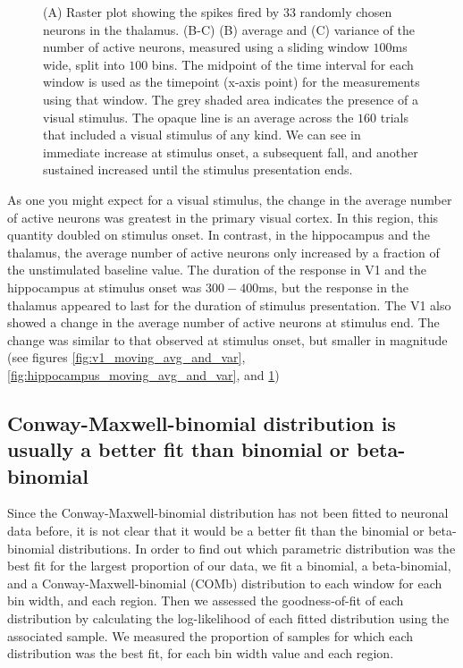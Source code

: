 \begin{figure}[p]
      \caption{(A) Raster plot showing the spikes fired by $33$ randomly chosen neurons in the thalamus. (B-C) (B) average and (C) variance of the number of active neurons, measured using a sliding window $100$ms wide, split into $100$ bins. The midpoint of the time interval for each window is used as the timepoint (x-axis point) for the measurements using that window. The grey shaded area indicates the presence of a visual stimulus. The opaque line is an average across the $160$ trials that included a visual stimulus of any kind. We can see in immediate increase at stimulus onset, a subsequent fall, and another sustained increased until the stimulus presentation ends.}
      \label{fig:thalamus_moving_avg_and_var}
    \end{figure}

    As one you might expect for a visual stimulus, the change in the average number of active neurons was greatest in the primary visual cortex. In this region, this quantity doubled on stimulus onset. In contrast, in the hippocampus and the thalamus, the average number of active neurons only increased by a fraction of the unstimulated baseline value. The duration of the response in V1 and the hippocampus at stimulus onset was $300-400$ms, but the response in the thalamus appeared to last for the duration of stimulus presentation. The V1 also showed a change in the average number of active neurons at stimulus end. The change was similar to that observed at stimulus onset, but smaller in magnitude (see figures \ref{fig:v1_moving_avg_and_var}, \ref{fig:hippocampus_moving_avg_and_var}, and \ref{fig:thalamus_moving_avg_and_var})

  \subsection{Conway-Maxwell-binomial distribution is usually a better fit than binomial or beta-binomial}
  Since the Conway-Maxwell-binomial distribution has not been fitted to neuronal data before, it is not clear that it would be a better fit than the binomial or beta-binomial distributions. In order to find out which parametric distribution was the best fit for the largest proportion of our data, we fit a binomial, a beta-binomial, and a Conway-Maxwell-binomial (COMb) distribution to each window for each bin width, and each region. Then we assessed the goodness-of-fit of each distribution by calculating the log-likelihood of each fitted distribution using the associated sample. We measured the proportion of samples for which each distribution was the best fit, for each bin width value and each region.

